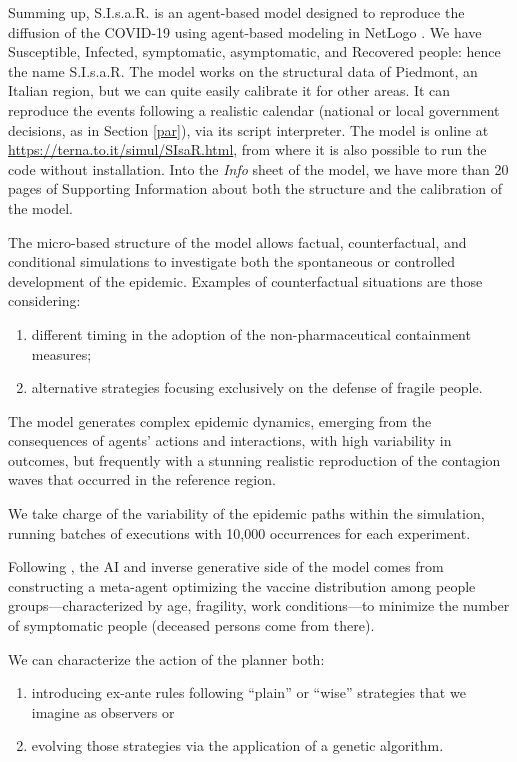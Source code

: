 \documentclass[graybox]{svmult}
\begin{document}
Summing up, S.I.s.a.R. \cite{SIsaR} is an agent-based model designed to reproduce the diffusion of the COVID-19 using agent-based modeling in NetLogo \cite{NetLogo}. We have Susceptible, Infected, symptomatic, asymptomatic, and Recovered people: hence the name S.I.s.a.R. The model works on the structural data of Piedmont, an Italian region, but we can quite easily calibrate it for other areas. It can reproduce the events following a realistic calendar (national or local government decisions, as in Section \ref{par}), via its script interpreter.  The model is online at \href{https://terna.to.it/simul/SIsaR.html}{https://terna.to.it/simul/SIsaR.html}, from where it is also possible to run the code without installation. Into the \emph{Info} sheet of the model, we have more than 20 pages of Supporting Information about both the structure and the calibration of the model.


The micro-based structure of the model allows factual, counterfactual, and conditional simulations to investigate both the spontaneous or controlled development of the epidemic. Examples of counterfactual situations are those considering:

\begin{enumerate}[label=\roman*]
\item different timing in the adoption of the non-pharmaceutical containment measures;
\item  alternative strategies focusing exclusively on the defense of fragile people.
\end{enumerate}

The model generates complex epidemic dynamics, emerging from the consequences of agents' actions and interactions, with high variability in outcomes, but frequently with a stunning realistic reproduction of the  contagion waves that occurred in the reference region. 

We take charge of the variability of the epidemic paths within the simulation, running batches of executions with 10,000 occurrences for each experiment.

Following \cite{inverseGen}, the AI and inverse generative side of the model comes from constructing a meta-agent optimizing the vaccine distribution among people groups---characterized by age, fragility, work conditions---to minimize the number of symptomatic people (deceased persons come from there).

We can characterize the action of the planner both:
\begin{enumerate}[label=\roman*]
\item introducing ex-ante rules following ``plain'' or ``wise'' strategies that we imagine as observers or
\item evolving those strategies via the application of a genetic algorithm. 
\end{enumerate}
\end{document}
